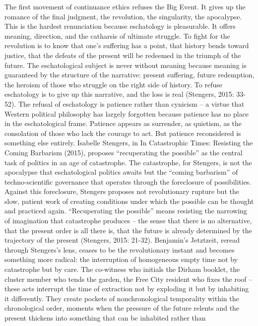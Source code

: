 The first movement of continuance ethics refuses the Big Event. It gives up the romance of the final judgment, the revolution, the singularity, the apocalypse. This is the hardest renunciation because eschatology is pleasurable. It offers meaning, direction, and the catharsis of ultimate struggle. To fight for the revolution is to know that one’s suffering has a point, that history bends toward justice, that the defeats of the present will be redeemed in the triumph of the future. The eschatological subject is never without meaning because meaning is guaranteed by the structure of the narrative: present suffering, future redemption, the heroism of those who struggle on the right side of history. To refuse eschatology is to give up this narrative, and the loss is real (Stengers, 2015: 33-52). The refusal of eschatology is patience rather than cynicism – a virtue that Western political philosophy has largely forgotten because patience has no place in the eschatological frame. Patience appears as surrender, as quietism, as the consolation of those who lack the courage to act. But patience reconsidered is something else entirely. Isabelle Stengers, in In Catastrophic Times: Resisting the Coming Barbarism (2015), proposes “recuperating the possible” as the central task of politics in an age of catastrophe. The catastrophe, for Stengers, is not the apocalypse that eschatological politics awaits but the “coming barbarism” of techno-scientific governance that operates through the foreclosure of possibilities. Against this foreclosure, Stengers proposes not revolutionary rupture but the slow, patient work of creating conditions under which the possible can be thought and practiced again. “Recuperating the possible” means resisting the narrowing of imagination that catastrophe produces – the sense that there is no alternative, that the present order is all there is, that the future is already determined by the trajectory of the present (Stengers, 2015: 21-32). Benjamin’s Jetztzeit, reread through Stengers’s lens, ceases to be the revolutionary instant and becomes something more radical: the interruption of homogeneous empty time not by catastrophe but by care. The co-witness who initials the Dirham booklet, the cluster member who tends the garden, the Free City resident who fixes the roof – these acts interrupt the time of extraction not by exploding it but by inhabiting it differently. They create pockets of nonchronological temporality within the chronological order, moments when the pressure of the future relents and the present thickens into something that can be inhabited rather than

